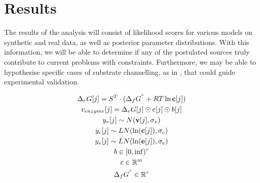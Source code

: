 \documentclass[11pt]{article}
\begin{document}
	\section{Results}
	The results of the analysis will consist of likelihood scores for various models on synthetic and real data,
	as well as posterior parameter distributions.
	With this information, we will be able to determine if any of the postulated sources truly contribute to current problems
	with constraints.
	Furthermore, we may be able to hypothesise specific cases of substrate channelling, as in \cite{gollub_2021_prob_sampling},
	that could guide experimental validation.

\printbibliography



\begin{gather*}
	\Delta_rG[j] = S^T\cdot (\Delta_fG^{\degree}+ RT\ln{\textbf{c}[j]})\\
	v_{enzyme}[j] = \Delta_rG[j] \odot e[j] \odot b[j] \\
	y_{v}[j] \sim N(\textbf{v}[j], \sigma_{v}) \\
	y_{c}[j] \sim LN(\ln(\textbf{c}[j]), \sigma_{c}) \\
	y_{e}[j] \sim LN(\ln(\textbf{e}[j]), \sigma_{e}) \\
	b \in \mathbb [0,\inf)^r \\
	c \in \mathbb{R}^m \\
	\Delta_fG^{\degree} \in \mathbb{R}^r \\
\end{gather*}
\end{document}
